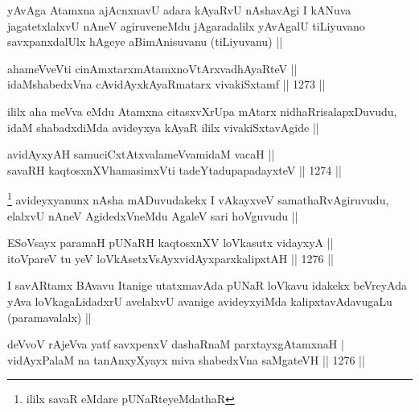 \begin{artha}
yAvAga Atamxna ajAcnxnavU adara kAyaRvU nAshavAgi I kANuva jagatetxlalxvU nAneV agiruveneMdu jAgaradalilx yAvAgalU tiLiyuvano savxpanxdalUlx hAgeye aBimAnisuvanu (tiLiyuvanu) ||
\end{artha}


\begin{shl}
ahameVveVti cinAmxtarxmAtamxnoV\s tArxvadhAyaRteV || \\
idaMshabedxVna cAvidAyxkAyaRmatarx vivakiSxtamf ||  1273 ||  
\end{shl}

\begin{artha}
ililx aha meVva eMdu Atamxna citasxvXrUpa mAtarx nidhaRrisalapxDuvudu, idaM shabadxdiMda avideyxya kAyaR ililx vivakiSxtavAgide ||
\end{artha}


\begin{shl}
avidAyxyAH samuciCxtAtxvalameVvamidaM vacaH || \\
savaRH kaqtosxnXV\s hamasimxVti tadeYtadupapadayxteV ||  1274 ||  
\end{shl}

\begin{artha}
\footnote{ililx savaR eMdare pUNaRteyeMdathaR}
avideyxyanunx nAsha mADuvudakekx I vAkayxveV samathaRvAgiruvudu, elalxvU nAneV AgidedxVneMdu AgaleV sari hoVguvudu ||
\end{artha}


\begin{shl}
ESoV\s sayx paramaH pUNaRH kaqtosxnXV loVkasutx vidayxyA || \\
itoV\s pareV tu yeV loVkAsetxV\s sAyxvidAyxparxkalipxtAH ||  1276 ||  
\end{shl}

\begin{artha}
I savARtamx BAvavu Itanige utatxmavAda pUNaR loVkavu idakekx beVreyAda yAva loVkagaLidadxrU avelalxvU avanige avideyxyiMda kalipxtavAdavugaLu (paramavalalx) ||
\end{artha}


\begin{shl}
deVvoV rAjeVva yatf savxpenxV dashaRnaM parxtayxgAtamxnaH |‍‍ \\
vidAyxPalaM na tanAnxyXyayx miva shabedxVna saMgateVH || 1276 ||
\end{shl}

